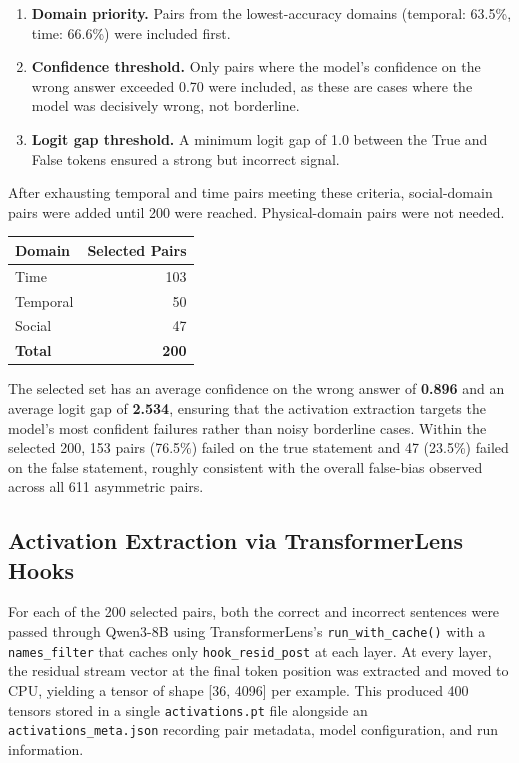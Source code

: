 \documentclass[11pt]{article}
\begin{document}
\begin{enumerate}[leftmargin=2em]
\item \textbf{Domain priority.} Pairs from the lowest-accuracy domains (temporal: 63.5\%, time: 66.6\%) were included first.
\item \textbf{Confidence threshold.} Only pairs where the model's confidence on the wrong answer exceeded 0.70 were included, as these are cases where the model was decisively wrong, not borderline.
\item \textbf{Logit gap threshold.} A minimum logit gap of 1.0 between the True and False tokens ensured a strong but incorrect signal.
\end{enumerate}

After exhausting temporal and time pairs meeting these criteria, social-domain pairs were added until 200 were reached. Physical-domain pairs were not needed.

\begin{center}
\begin{tabular}{l r}
\toprule
\textbf{Domain} & \textbf{Selected Pairs} \\
\midrule
Time     & 103 \\
Temporal &  50 \\
Social   &  47 \\
\midrule
\textbf{Total} & \textbf{200} \\
\bottomrule
\end{tabular}
\end{center}

The selected set has an average confidence on the wrong answer of \textbf{0.896} and an average logit gap of \textbf{2.534}, ensuring that the activation extraction targets the model's most confident failures rather than noisy borderline cases. Within the selected 200, 153 pairs (76.5\%) failed on the true statement and 47 (23.5\%) failed on the false statement, roughly consistent with the overall false-bias observed across all 611 asymmetric pairs.

\subsection*{Activation Extraction via TransformerLens Hooks}

For each of the 200 selected pairs, both the correct and incorrect sentences were passed through Qwen3-8B using TransformerLens's \texttt{run\_with\_cache()} with a \texttt{names\_filter} that caches only \texttt{hook\_resid\_post} at each layer. At every layer, the residual stream vector at the final token position was extracted and moved to CPU, yielding a tensor of shape [36, 4096] per example. This produced 400 tensors stored in a single \texttt{activations.pt} file alongside an \texttt{activations\_meta.json} recording pair metadata, model configuration, and run information.
\end{document}
